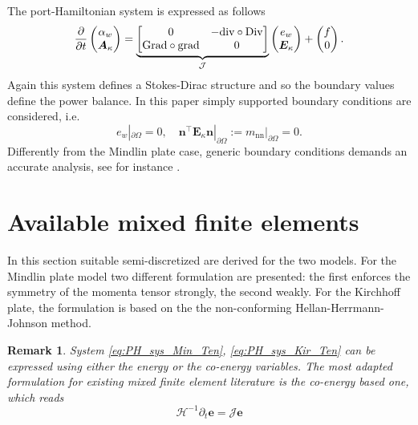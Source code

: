 \documentclass{ifacconf}
\newtheorem{remark}{Remark}
\begin{document}
The port-Hamiltonian system is expressed as follows 
\begin{equation}
\label{eq:PH_sys_Kir_Ten}
\diffp{}{t}
\begin{pmatrix}
\alpha_w \\
\bm{A}_\kappa \\
\end{pmatrix} = 
\underbrace{\begin{bmatrix}
	0  & -\mathrm{div} \circ \mathrm{Div} \\
	\mathrm{Grad} \circ \mathrm{grad}  & 0 \\
	\end{bmatrix}}_{\mathcal{J}}
\begin{pmatrix}
e_w \\
\bm{E}_{\kappa} \\
\end{pmatrix}+ 
\begin{pmatrix}
f \\
0 \\
\end{pmatrix}.
\end{equation}
Again this system defines a Stokes-Dirac structure and so the boundary values define the power balance. In this paper simply supported boundary conditions are considered, i.e.
\[
e_w|_{\partial \Omega} = 0, \quad \bm{n}^\top \bm{E}_\kappa \bm{n}|_{\partial \Omega}:= m_{\text{nn}}|_{\partial \Omega} = 0.
\]
Differently from the Mindlin plate case, generic boundary conditions demands an accurate analysis, see for instance \cite{Blum1990,mixed_kirchhoff}.

\section{Available mixed finite elements}

In this section suitable semi-discretized are derived for the two models. For the Mindlin plate model two different formulation are presented: the first enforces the symmetry of the momenta tensor strongly, the second weakly. For the Kirchhoff plate, the formulation is based on the the non-conforming Hellan-Herrmann-Johnson method. 

\begin{remark}
System \eqref{eq:PH_sys_Min_Ten}, \eqref{eq:PH_sys_Kir_Ten} can be expressed using either the energy or the co-energy variables. The  most adapted formulation for existing mixed finite element literature is the co-energy based one, which reads
\[
\mathcal{H}^{-1} \partial_t \bm{e} = \mathcal{J} \bm{e}
\]
\end{remark}
\end{document}
